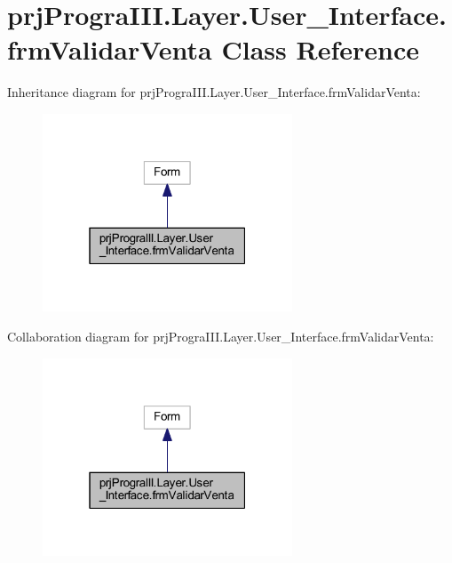 \hypertarget{classprj_progra_i_i_i_1_1_layer_1_1_user___interface_1_1frm_validar_venta}{}\section{prj\+Progra\+I\+I\+I.\+Layer.\+User\+\_\+\+Interface.\+frm\+Validar\+Venta Class Reference}
\label{classprj_progra_i_i_i_1_1_layer_1_1_user___interface_1_1frm_validar_venta}


Inheritance diagram for prj\+Progra\+I\+I\+I.\+Layer.\+User\+\_\+\+Interface.\+frm\+Validar\+Venta\+:
\nopagebreak
\begin{figure}[H]
\begin{center}
\leavevmode
\includegraphics[width=211pt]{classprj_progra_i_i_i_1_1_layer_1_1_user___interface_1_1frm_validar_venta__inherit__graph}
\end{center}
\end{figure}


Collaboration diagram for prj\+Progra\+I\+I\+I.\+Layer.\+User\+\_\+\+Interface.\+frm\+Validar\+Venta\+:
\nopagebreak
\begin{figure}[H]
\begin{center}
\leavevmode
\includegraphics[width=211pt]{classprj_progra_i_i_i_1_1_layer_1_1_user___interface_1_1frm_validar_venta__coll__graph}
\end{center}
\end{figure}
